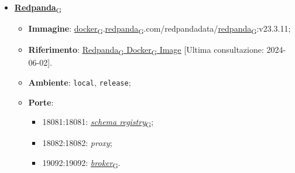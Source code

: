 \begin{itemize}
	\item \href{https://7last.github.io/docs/pb/documentazione-interna/glossario\#redpanda}{\textbf{Redpanda}\textsubscript{G}}
	      \begin{itemize}
		      \item \textbf{Immagine}: \href{https://7last.github.io/docs/pb/documentazione-interna/glossario\#docker}{docker\textsubscript{G}}.\href{https://7last.github.io/docs/pb/documentazione-interna/glossario\#redpanda}{redpanda\textsubscript{G}}.com/redpandadata/\href{https://7last.github.io/docs/pb/documentazione-interna/glossario\#redpanda}{redpanda\textsubscript{G}}:v23.3.11;
		      \item \textbf{Riferimento}: \underline{\href{https://hub.docker.com/r/redpandadata/redpanda}{\href{https://7last.github.io/docs/pb/documentazione-interna/glossario\#redpanda}{Redpanda\textsubscript{G}} \href{https://7last.github.io/docs/pb/documentazione-interna/glossario\#docker}{Docker\textsubscript{G}} Image}} [Ultima consultazione: 2024-06-02].
		      \item \textbf{Ambiente}: \texttt{local}, \texttt{release};
		      \item \textbf{Porte}:
		            \begin{itemize}
			            \item 18081:18081: \href{https://7last.github.io/docs/pb/documentazione-interna/glossario\#schema-registry}{\textit{schema registry}\textsubscript{G}};
			            \item 18082:18082: \textit{proxy};
			            \item 19092:19092: \href{https://7last.github.io/docs/pb/documentazione-interna/glossario\#broker}{\textit{broker}\textsubscript{G}}.
		            \end{itemize}
	      \end{itemize}


\end{itemize}
